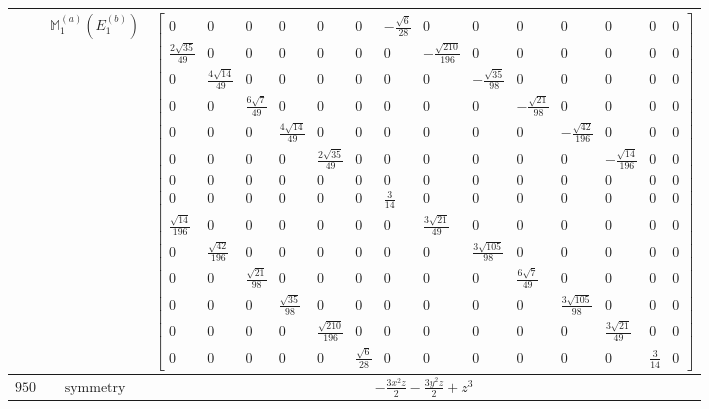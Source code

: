 \documentclass[fleqn,8pt,landscape]{jsarticle}
\begin{document}
\begin{longtable}{ccc}
$  $ & $ \mathbb{M}_{1}^{(a)}(E_{1}^{(b)}) $ & $ \begin{bmatrix} 0 & 0 & 0 & 0 & 0 & 0 & - \frac{\sqrt{6}}{28} & 0 & 0 & 0 & 0 & 0 & 0 & 0 \\ \frac{2 \sqrt{35}}{49} & 0 & 0 & 0 & 0 & 0 & 0 & - \frac{\sqrt{210}}{196} & 0 & 0 & 0 & 0 & 0 & 0 \\ 0 & \frac{4 \sqrt{14}}{49} & 0 & 0 & 0 & 0 & 0 & 0 & - \frac{\sqrt{35}}{98} & 0 & 0 & 0 & 0 & 0 \\ 0 & 0 & \frac{6 \sqrt{7}}{49} & 0 & 0 & 0 & 0 & 0 & 0 & - \frac{\sqrt{21}}{98} & 0 & 0 & 0 & 0 \\ 0 & 0 & 0 & \frac{4 \sqrt{14}}{49} & 0 & 0 & 0 & 0 & 0 & 0 & - \frac{\sqrt{42}}{196} & 0 & 0 & 0 \\ 0 & 0 & 0 & 0 & \frac{2 \sqrt{35}}{49} & 0 & 0 & 0 & 0 & 0 & 0 & - \frac{\sqrt{14}}{196} & 0 & 0 \\ 0 & 0 & 0 & 0 & 0 & 0 & 0 & 0 & 0 & 0 & 0 & 0 & 0 & 0 \\ 0 & 0 & 0 & 0 & 0 & 0 & \frac{3}{14} & 0 & 0 & 0 & 0 & 0 & 0 & 0 \\ \frac{\sqrt{14}}{196} & 0 & 0 & 0 & 0 & 0 & 0 & \frac{3 \sqrt{21}}{49} & 0 & 0 & 0 & 0 & 0 & 0 \\ 0 & \frac{\sqrt{42}}{196} & 0 & 0 & 0 & 0 & 0 & 0 & \frac{3 \sqrt{105}}{98} & 0 & 0 & 0 & 0 & 0 \\ 0 & 0 & \frac{\sqrt{21}}{98} & 0 & 0 & 0 & 0 & 0 & 0 & \frac{6 \sqrt{7}}{49} & 0 & 0 & 0 & 0 \\ 0 & 0 & 0 & \frac{\sqrt{35}}{98} & 0 & 0 & 0 & 0 & 0 & 0 & \frac{3 \sqrt{105}}{98} & 0 & 0 & 0 \\ 0 & 0 & 0 & 0 & \frac{\sqrt{210}}{196} & 0 & 0 & 0 & 0 & 0 & 0 & \frac{3 \sqrt{21}}{49} & 0 & 0 \\ 0 & 0 & 0 & 0 & 0 & \frac{\sqrt{6}}{28} & 0 & 0 & 0 & 0 & 0 & 0 & \frac{3}{14} & 0 \end{bmatrix} $ \\ \hline
$ 950 $ & $ \text{symmetry} $ & $ - \frac{3 x^{2} z}{2} - \frac{3 y^{2} z}{2} + z^{3} $ \\

\end{longtable}
\end{document}
